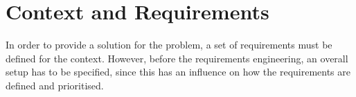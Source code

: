 \chapter{Context and Requirements}\label{chpt:context_spec}
In order to provide a solution for the problem, a set of requirements must be defined for the context. However, before the requirements engineering, an overall setup has to be specified, since this has an influence on how the requirements are defined and prioritised. 



